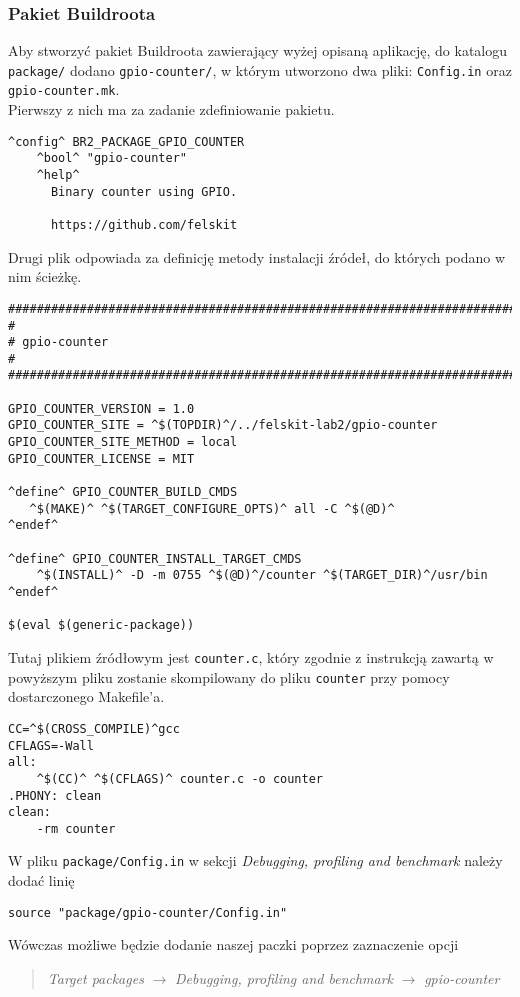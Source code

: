 \documentclass[10pt,a4paper]{article}
\begin{document}
\subsubsection{Pakiet Buildroota}
Aby stworzyć pakiet Buildroota zawierający wyżej opisaną aplikację, do katalogu \texttt{package/} dodano \texttt{gpio-counter/}, w którym utworzono dwa pliki: \texttt{Config.in} oraz \texttt{gpio-counter.mk}.\\[\baselineskip]
Pierwszy z nich ma za zadanie zdefiniowanie pakietu.
\begin{lstlisting}[style=bash, caption={Zawartość pliku Config.in}]
^config^ BR2_PACKAGE_GPIO_COUNTER
	^bool^ "gpio-counter"
	^help^
	  Binary counter using GPIO.

	  https://github.com/felskit
\end{lstlisting}
Drugi plik odpowiada za definicję metody instalacji źródeł, do których podano w nim ścieżkę.
\begin{lstlisting}[style=bash, caption={Zawartość pliku gpio-counter.mk}, keywordstyle=\color{black}]
################################################################################
#
# gpio-counter
#
################################################################################

GPIO_COUNTER_VERSION = 1.0
GPIO_COUNTER_SITE = ^$(TOPDIR)^/../felskit-lab2/gpio-counter
GPIO_COUNTER_SITE_METHOD = local
GPIO_COUNTER_LICENSE = MIT

^define^ GPIO_COUNTER_BUILD_CMDS
   ^$(MAKE)^ ^$(TARGET_CONFIGURE_OPTS)^ all -C ^$(@D)^
^endef^

^define^ GPIO_COUNTER_INSTALL_TARGET_CMDS
    ^$(INSTALL)^ -D -m 0755 ^$(@D)^/counter ^$(TARGET_DIR)^/usr/bin
^endef^

$(eval $(generic-package))
\end{lstlisting}
Tutaj plikiem źródłowym jest \texttt{counter.c}, który zgodnie z instrukcją zawartą w powyższym pliku zostanie skompilowany do pliku \texttt{counter} przy pomocy dostarczonego Makefile'a.
\begin{lstlisting}[style=bash, caption={Zawartość pliku Makefile}]
CC=^$(CROSS_COMPILE)^gcc
CFLAGS=-Wall
all:
	^$(CC)^ ^$(CFLAGS)^ counter.c -o counter
.PHONY: clean
clean:
	-rm counter
\end{lstlisting}
W pliku \texttt{package/Config.in} w sekcji \textit{Debugging, profiling and benchmark} należy dodać linię
\begin{lstlisting}[style=bash]
source "package/gpio-counter/Config.in"
\end{lstlisting}
Wówczas możliwe będzie dodanie naszej paczki poprzez zaznaczenie opcji
\begin{quote}
	\textit{Target packages} $\rightarrow$ \textit{Debugging, profiling and benchmark} $\rightarrow$ \textit{gpio-counter}
\end{quote}
\end{document}
